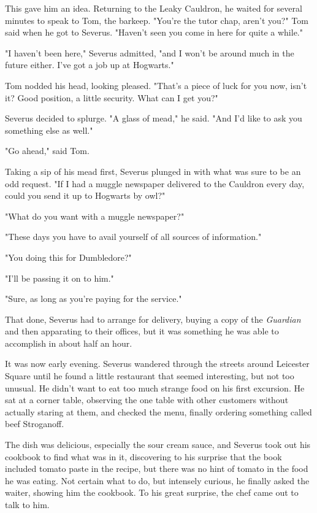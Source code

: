 This gave him an idea. Returning to the Leaky Cauldron, he waited for several minutes to speak to Tom, the barkeep. "You're the tutor chap, aren't you?" Tom said when he got to Severus. "Haven't seen you come in here for quite a while."

"I haven't been here," Severus admitted, "and I won't be around much in the future either. I've got a job up at Hogwarts."

Tom nodded his head, looking pleased. "That's a piece of luck for you now, isn't it? Good position, a little security. What can I get you?"

Severus decided to splurge. "A glass of mead," he said. "And I'd like to ask you something else as well."

"Go ahead," said Tom.

Taking a sip of his mead first, Severus plunged in with what was sure to be an odd request. "If I had a muggle newspaper delivered to the Cauldron every day, could you send it up to Hogwarts by owl?"

"What do you want with a muggle newspaper?"

"These days you have to avail yourself of all sources of information."

"You doing this for Dumbledore?"

"I'll be passing it on to him."

"Sure, as long as you're paying for the service."

That done, Severus had to arrange for delivery, buying a copy of the \emph{Guardian} and then apparating to their offices, but it was something he was able to accomplish in about half an hour.

It was now early evening. Severus wandered through the streets around Leicester Square until he found a little restaurant that seemed interesting, but not too unusual. He didn't want to eat too much strange food on his first excursion. He sat at a corner table, observing the one table with other customers without actually staring at them, and checked the menu, finally ordering something called beef Stroganoff.

The dish was delicious, especially the sour cream sauce, and Severus took out his cookbook to find what was in it, discovering to his surprise that the book included tomato paste in the recipe, but there was no hint of tomato in the food he was eating. Not certain what to do, but intensely curious, he finally asked the waiter, showing him the cookbook. To his great surprise, the chef came out to talk to him.

